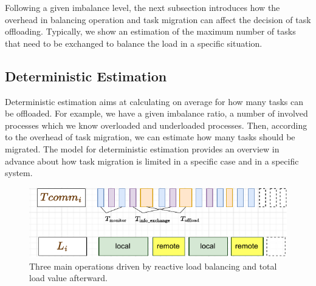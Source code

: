 
Following a given imbalance level, the next subsection introduces how the overhead in balancing operation and task migration can affect the decision of task offloading. Typically, we show an estimation of the maximum number of tasks that need to be exchanged to balance the load in a specific situation.

\subsection{Deterministic Estimation} \label{subsec:deterministic_estimation}

Deterministic estimation aims at calculating on average for how many tasks can be offloaded. For example, we have a given imbalance ratio, a number of involved processes which we know overloaded and underloaded processes. Then, according to the overhead of task migration, we can estimate how many tasks should be migrated. The model for deterministic estimation provides an overview in advance about how task migration is limited in a specific case and in a specific system.\\

\begin{figure}[t]
  \centering
	\includegraphics[scale=0.8]{./pictures/perf_analysis_model/perf_inline_fig_Li_and_Tcomm.pdf}
	\caption{Three main operations driven by reactive load balancing and total load value afterward.}
	\label{fig:detailed_Tcomm_operations_and_L}
\end{figure}

